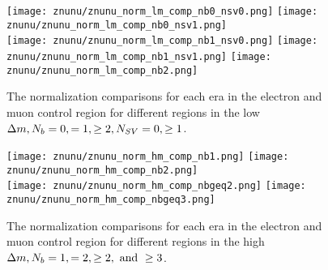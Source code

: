 \begin{figure}[!h]
	\begin{center}
  \texttt{[image: znunu/znunu\_norm\_lm\_comp\_nb0\_nsv0.png]}
  \texttt{[image: znunu/znunu\_norm\_lm\_comp\_nb0\_nsv1.png]} \\
  \texttt{[image: znunu/znunu\_norm\_lm\_comp\_nb1\_nsv0.png]}
  \texttt{[image: znunu/znunu\_norm\_lm\_comp\_nb1\_nsv1.png]} 
  \texttt{[image: znunu/znunu\_norm\_lm\_comp\_nb2.png]} \\

	\end{center}
	\caption[\Znunu{} Normalization Low \dm{} Comparisons]{The \Znunu{} normalization comparisons for each era in the electron and muon control region for different regions in the low $\Delta m, N_{b}=0,=1,\geq2, N_{SV}=0,\geq1$.
	 }
	\label{fig:znunu-norm-lm-comp}
\end{figure}

\begin{figure}[!h]
	\begin{center}
  \texttt{[image: znunu/znunu\_norm\_hm\_comp\_nb1.png]}
  \texttt{[image: znunu/znunu\_norm\_hm\_comp\_nb2.png]} \\
  \texttt{[image: znunu/znunu\_norm\_hm\_comp\_nbgeq2.png]}
  \texttt{[image: znunu/znunu\_norm\_hm\_comp\_nbgeq3.png]} \\
	\end{center}
	\caption[\Znunu{} Normalization High \dm{} Comparisons]{The \Znunu{} normalization comparisons for each era in the electron and muon control region for different regions in the high $\Delta m, N_{b}=1,=2,\geq2, \text{ and } \geq3$.
	 }
	\label{fig:znunu-norm-hm-comp}
\end{figure}
